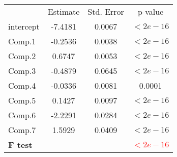 \documentclass[xcolor=table]{beamer}
\begin{document}
\begin{frame}
\begin{tabular}{ |l|S|S|c| }
\hline
{}  \\
\hline
{}
 & Estimate & Std. Error & p-value \\
\hline
intercept & -7.4181 & 0.0067 & $<2e-16$ \\
Comp.1 & -0.2536 & 0.0038 & $<2e-16$ \\
Comp.2 & 0.6747 & 0.0053 & $<2e-16$ \\
Comp.3 & -0.4879 & 0.0645 & $<2e-16$ \\
Comp.4 & -0.0336 & 0.0081 & 0.0001 \\
Comp.5 & 0.1427 & 0.0097 & $<2e-16$ \\
Comp.6 & -2.2291 & 0.0284 & $<2e-16$ \\
Comp.7 & 1.5929 & 0.0409 & $<2e-16$ \\
\textbf{F test} &  &  & \textcolor{red}{$<2e-16$} \\
\hline
\end{tabular}


\end{frame}
\end{document}

